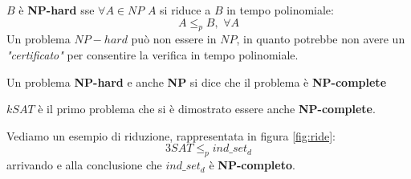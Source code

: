 \begin{definizione}
  $B$ è \textbf{NP-hard} sse $\forall A\in NP$ $A$ si riduce a $B$ in tempo
  polinomiale:
  \[A\leq_p B,\,\,\forall A\]
  Un problema $NP-hard$ può non essere in $NP$, in quanto potrebbe non avere un
  \textit{"certificato"} per consentire la verifica in tempo polinomiale.
\end{definizione}
\begin{definizione}
  Un problema \textbf{NP-hard} e anche \textbf{NP} si dice che il problema è
  \textbf{NP-complete} 
\end{definizione}
$kSAT$ è il primo problema che si è dimostrato essere anche
\textbf{NP-complete}.
\begin{esempio}
  Vediamo un esempio di riduzione, rappresentata in figura \ref{fig:ride}:
  \[3SAT\leq_p ind\_set_d\]
  arrivando e alla conclusione che $ind\_set_d$ è \textbf{NP-completo}.\\
  \begin{figure}
    \centering
    

\end{figure}
\end{esempio}
